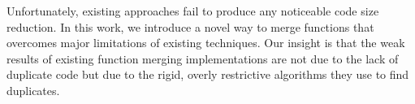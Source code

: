 


Unfortunately, existing approaches fail  to produce any noticeable code size reduction.
In this work, we introduce a novel way to merge functions that overcomes major limitations of existing techniques.
Our insight is that the weak results of existing function merging implementations are not due to the lack of duplicate code but due to the rigid, overly restrictive algorithms they use to find duplicates.


